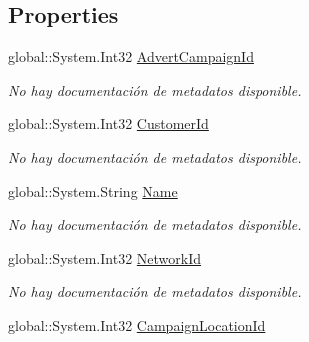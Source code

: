 \subsection*{Properties}
\begin{DoxyCompactItemize}
\item 
global\-::\-System.\-Int32 \hyperlink{class_microsoft_1_1_samples_1_1_kinect_1_1_basic_interactions_1_1_advert_campaigns_a7d8aeeb07836400b4354f90461b4f407}{Advert\-Campaign\-Id}
\begin{DoxyCompactList}\small\item\em No hay documentación de metadatos disponible. \end{DoxyCompactList}\item 
global\-::\-System.\-Int32 \hyperlink{class_microsoft_1_1_samples_1_1_kinect_1_1_basic_interactions_1_1_advert_campaigns_a90c49f3fb1e55d3ca2e64ce90230908e}{Customer\-Id}
\begin{DoxyCompactList}\small\item\em No hay documentación de metadatos disponible. \end{DoxyCompactList}\item 
global\-::\-System.\-String \hyperlink{class_microsoft_1_1_samples_1_1_kinect_1_1_basic_interactions_1_1_advert_campaigns_a47494e39401e8067bfaec193b5a218b1}{Name}
\begin{DoxyCompactList}\small\item\em No hay documentación de metadatos disponible. \end{DoxyCompactList}\item 
global\-::\-System.\-Int32 \hyperlink{class_microsoft_1_1_samples_1_1_kinect_1_1_basic_interactions_1_1_advert_campaigns_ad5e6057af4eb97a6fd786d9f787da92b}{Network\-Id}
\begin{DoxyCompactList}\small\item\em No hay documentación de metadatos disponible. \end{DoxyCompactList}\item 
global\-::\-System.\-Int32 \hyperlink{class_microsoft_1_1_samples_1_1_kinect_1_1_basic_interactions_1_1_advert_campaigns_a7c3208ed3c2e9754e7806af720dfbdef}{Campaign\-Location\-Id}

\end{DoxyCompactItemize}
